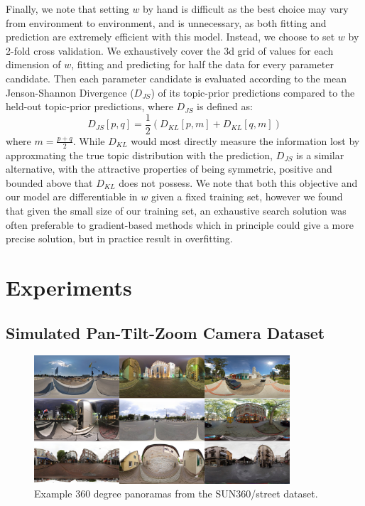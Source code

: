 Finally, we note that setting $w$ by hand is difficult as the best choice may vary from environment to environment, and is unnecessary, as both fitting and prediction are extremely efficient with this model. Instead, we choose to set $w$ by 2-fold cross validation. We exhaustively cover the 3d grid of values for each dimension of $w$, fitting and predicting for half the data for every parameter candidate. Then each parameter candidate is evaluated according to the mean Jenson-Shannon Divergence ($D_{JS}$) of its topic-prior predictions compared to the held-out topic-prior predictions, where $D_{JS}$ is defined as:
\begin{equation}
D_{JS}\left[ p, q \right] = \frac{1}{2} \left(D_{KL}[p, m] + D_{KL}[q, m]\right)
\end{equation}
where $m = \frac{p+q}{2}$. While $D_{KL}$ would most directly measure the information lost by approxmating the true topic distribution with the prediction, $D_{JS}$ is a similar alternative, with the attractive properties of being symmetric, positive and bounded above that $D_{KL}$
 does not possess. We note that both this objective and our model are differentiable in $w$ given a fixed training set, however we found that given the small size of our training set, an exhaustive search solution was often preferable to gradient-based methods which in principle could give a more precise solution, but in practice result in overfitting.

\section{Experiments}

\subsection{Simulated Pan-Tilt-Zoom Camera Dataset}
\begin{figure}
    \centering
    \includegraphics[width=0.85\textwidth]{figures/ptz/sun360_9x.png}
    \caption{Example 360 degree panoramas from the SUN360/street dataset.}
    \label{fig:sun360_ex}
\end{figure}

